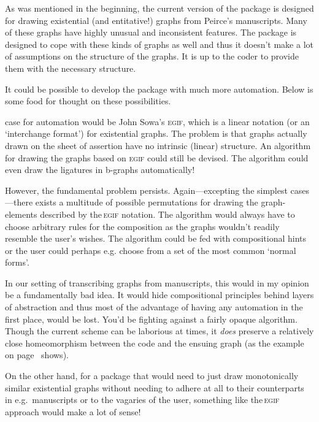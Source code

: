 \documentclass[a4paper,justified]{tufte-handout}
\newcommand{\greek}[1]{{\selectlanguage{polutonikogreek}#1\selectlanguage{english}}}
\begin{document}
As was mentioned in the beginning, the current version of the package is designed for drawing existential (and entitative!) graphs from Peirce's manuscripts. Many of these graphs have highly unusual and inconsistent features. The package is designed to cope with these kinds of graphs as well and thus it doesn't make a lot of assumptions on the structure of the graphs. It is up to the coder to provide them with the necessary structure.

It could be possible to develop the package with much more automation. Below is some food for thought on these possibilities.

 case for automation would be John Sowa's \textsc{egif}, %
which is a linear notation (or an `interchange format') for existential graphs. The problem is that graphs actually drawn on the sheet of assertion have no intrinsic (linear) structure. An algorithm for drawing the graphs based on \textsc{egif} could still be devised. The algorithm could even draw the ligatures in \greek{b}-graphs automatically!

However, the fundamental problem persists. Again---excepting the simplest cases---there exists a multitude of possible permutations for drawing the graph-elements described by the\,\textsc{egif} notation. The algorithm would always have to choose arbitrary rules for the composition as the graphs wouldn't readily resemble the user's wishes. The algorithm could be fed with compositional hints or the user could perhaps e.g. choose from a set of the most common `normal forms'.

In our setting of transcribing graphs from manuscripts, this would in my opinion be a fundamentally bad idea. It would hide compositional principles behind layers of abstraction and thus most of the advantage of having any automation in the first place, would be lost. You'd be fighting against a fairly opaque algorithm. Though the current scheme can be laborious at times, it \textit{does} preserve a relatively close homeomorphism between the code and the ensuing graph (as the example on page~\pageref{homeomorphism} shows).

On the other hand, for a package that would need to just draw monotonically similar existential graphs without needing to adhere at all to their counterparts in e.g.\ manuscripts or to the vagaries of the user, something like the\,\textsc{egif} approach would make a lot of sense!
\end{document}
